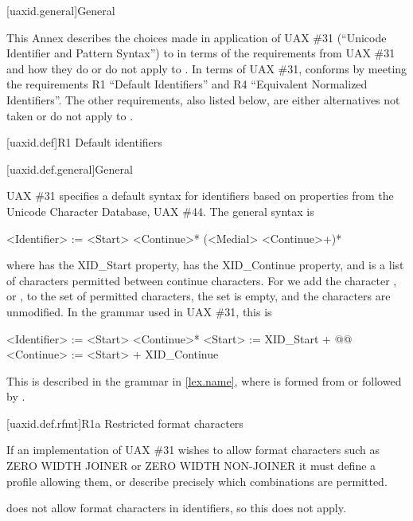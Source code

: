 
[uaxid.general]{General}

\pnum
This Annex describes the choices made in application of
UAX \#31 (``Unicode Identifier and Pattern Syntax'')
to \Cpp{} in terms of the requirements from UAX \#31 and
how they do or do not apply to \Cpp{}.
In terms of UAX \#31,
\Cpp{} conforms by meeting the requirements
R1 ``Default Identifiers'' and
R4 ``Equivalent Normalized Identifiers''.
The other requirements, also listed below,
are either alternatives not taken or do not apply to \Cpp{}.

[uaxid.def]{R1 Default identifiers}

[uaxid.def.general]{General}

\pnum
UAX \#31 specifies a default syntax for identifiers
based on properties from the Unicode Character Database, UAX \#44.
The general syntax is
\begin{outputblock}
<Identifier> := <Start> <Continue>* (<Medial> <Continue>+)*
\end{outputblock}
where  has the XID_Start property,
 has the XID_Continue property, and
 is a list of characters permitted between continue characters.
For \Cpp{} we add the character , or \tcode{_},
to the set of permitted  characters,
the  set is empty, and
the  characters are unmodified.
In the grammar used in UAX \#31, this is
\begin{outputblock}
<Identifier> := <Start> <Continue>*
<Start> := XID_Start + @\textrm{}@
<Continue> := <Start> + XID_Continue
\end{outputblock}

\pnum
This is described in the \Cpp{} grammar in \ref{lex.name},
where  is formed from
 or
 followed by .

[uaxid.def.rfmt]{R1a Restricted format characters}

\pnum
If an implementation of UAX \#31 wishes to allow format characters
such as ZERO WIDTH JOINER or ZERO WIDTH NON-JOINER
it must define a profile allowing them, or
describe precisely which combinations are permitted.

\pnum
\Cpp{} does not allow format characters in identifiers, so this does not apply.

